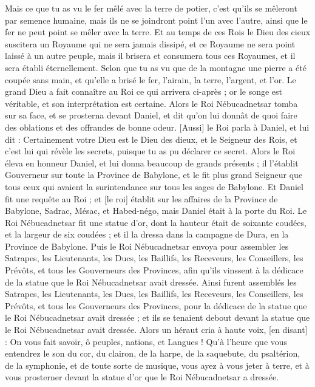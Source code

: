 \begin{multicols}{2}
Mais ce que tu as vu le fer mêlé avec la terre de potier, c'est qu'ils se mêleront par semence humaine, mais ils ne se joindront point l'un avec l'autre, ainsi que le fer ne peut point se mêler avec la terre.
Et au temps de ces Rois le Dieu des cieux suscitera un Royaume qui ne sera jamais dissipé, et ce Royaume ne sera point laissé à un autre peuple, mais il brisera et consumera tous ces Royaumes, et il sera établi éternellement.
Selon que tu as vu que de la montagne une pierre a été coupée sans main, et qu'elle a brisé le fer, l'airain, la terre, l'argent, et l'or. Le grand Dieu a fait connaître au Roi ce qui arrivera ci-après ; or le songe est véritable, et son interprétation est certaine.
Alors le Roi Nébucadnetsar tomba sur sa face, et se prosterna devant Daniel, et dit qu'on lui donnât de quoi faire des oblations et des offrandes de bonne odeur.
[Aussi] le Roi parla à Daniel, et lui dit : Certainement votre Dieu est le Dieu des dieux, et le Seigneur des Rois, et c'est lui qui révèle les secrets, puisque tu as pu déclarer ce secret.
Alors le Roi éleva en honneur Daniel, et lui donna beaucoup de grands présents ; il l'établit Gouverneur sur toute la Province de Babylone, et le fit plus grand Seigneur que tous ceux qui avaient la surintendance sur tous les sages de Babylone.
Et Daniel fit une requête au Roi ; et [le roi] établit sur les affaires de la Province de Babylone, Sadrac, Mésac, et Habed-négo, mais Daniel était à la porte du Roi.
\VerseOne{}Le Roi Nébucadnetsar fit une statue d'or, dont la hauteur était de soixante coudées, et la largeur de six coudées ; et il la dressa dans la campagne de Dura, en la Province de Babylone.
Puis le Roi Nébucadnetsar envoya pour assembler les Satrapes, les Lieutenants, les Ducs, les Baillifs, les Receveurs, les Conseillers, les Prévôts, et tous les Gouverneurs des Provinces, afin qu'ils vinssent à la dédicace de la statue que le Roi Nébucadnetsar avait dressée.
Ainsi furent assemblés les Satrapes, les Lieutenants, les Ducs, les Baillifs, les Receveurs, les Conseillers, les Prévôts, et tous les Gouverneurs des Provinces, pour la dédicace de la statue que le Roi Nébucadnetsar avait dressée ; et ils se tenaient debout devant la statue que le Roi Nébucadnetsar avait dressée.
Alors un héraut cria à haute voix, [en disant] : On vous fait savoir, ô peuples, nations, et Langues !
Qu'à l'heure que vous entendrez le son du cor, du clairon, de la harpe, de la saquebute, du psaltérion, de la symphonie, et de toute sorte de musique, vous ayez à vous jeter à terre, et à vous prosterner devant la statue d'or que le Roi Nébucadnetsar a dressée.

\end{multicols}
